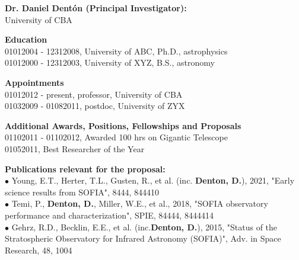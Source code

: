 %
\textbf{\color{Blue}\large Dr. Daniel Dent{\'o}n (Principal Investigator):}\\
University of CBA
\par \vspace{-0.5em}
\textbf{Education}\\
01012004 - 12312008, University of ABC, Ph.D., astrophysics\\
01012000 - 12312003, University of XYZ, B.S., astronomy
\par \vspace{-0.5em}
\textbf{Appointments}\\
01012012 - present, professor, University of CBA\\
01032009 - 01082011, postdoc, University of ZYX
\par \vspace{-0.5em}
\textbf{Additional Awards, Positions, Fellowships and Proposals}\\
01102011 - 01102012, Awarded 100 hrs on Gigantic Telescope\\
01052011, Best Researcher of the Year
\par \vspace{-0.5em}
\textbf{Publications relevant for the proposal:}\\
{\scriptsize{$\bullet$}} Young, E.T., Herter, T.L., Gusten, R., et al. (inc. \textbf{Denton, D.}), 2021, "Early science results from SOFIA", 8444, 844410\\
{\scriptsize{$\bullet$}} Temi, P., \textbf{Denton, D.}, Miller, W.E., et al., 2018, "SOFIA observatory performance and characterization", SPIE, 84444, 8444414\\
{\scriptsize{$\bullet$}} Gehrz, R.D., Becklin, E.E., et al. (inc.\textbf{Denton, D.}), 2015, "Status of the Stratospheric Observatory for Infrared Astronomy (SOFIA)", Adv. in Space Research, 48, 1004\\
